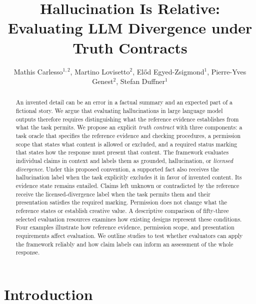 \documentclass{clv2025}
\title{Hallucination Is Relative:
Evaluating LLM Divergence under Truth Contracts}
\author{Mathis Carlesso$^{1,2}$, Martino Lovisetto$^{2}$, El\H{o}d Egyed-Zsigmond$^{1}$, Pierre-Yves Genest$^{2}$, Stefan Duffner$^{1}$}
\affil{INSA Lyon, CNRS, LIRIS, UMR5205, Universit\'e Claude Bernard Lyon 1, 69621 Villeurbanne, France\\
  \quad \email{mathis.carlesso@insa-lyon.fr}}
\affil{Alteca, 69100 Villeurbanne, France}
\begin{document}
\maketitle


\begin{abstract}
An invented detail can be an error in a factual summary and an expected
part of a fictional story. We argue that evaluating hallucinations in
large language model outputs therefore requires distinguishing what the
reference evidence establishes from what the task permits. We propose an
explicit \emph{truth contract} with three components: a task oracle that
specifies the reference evidence and checking procedures, a permission
scope that states what content is allowed or excluded, and a required status
marking that states how the response must present that content.
The framework evaluates individual claims in context and labels them as
grounded, hallucination, or \emph{licensed divergence}. Under this proposed
convention, a supported fact also receives the hallucination label when
the task explicitly excludes it in favor of invented content. Its evidence
state remains entailed. Claims left unknown
or contradicted by the reference receive the licensed-divergence label
when the task permits them and their presentation satisfies the required
marking. Permission does not change what the reference states or
establish creative value. A descriptive comparison of fifty-three selected
evaluation resources examines how existing designs represent these
conditions. Four examples illustrate how reference evidence, permission scope,
and presentation requirements affect evaluation. We outline
studies to test whether evaluators can apply the framework reliably and
how claim labels can inform an assessment of the whole response.
\end{abstract}

\section{Introduction}\label{sec:intro}
\end{document}
